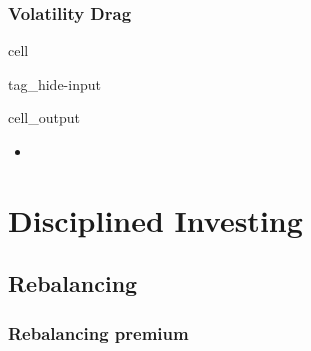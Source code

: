 \documentclass[letterpaper,10pt,english]{jupyterBook}
\begin{document}
\subsubsection{Volatility Drag}
\label{\detokenize{ch/principles/intro_nb:volatility-drag}}\label{\detokenize{ch/principles/intro_nb:fin-edu-principles-time-volatility-drag}}
\begin{sphinxuseclass}{cell}
\begin{sphinxuseclass}{tag_hide-input}\begin{sphinxVerbatimOutput}

\begin{sphinxuseclass}{cell_output}
\noindent{}

\end{sphinxuseclass}\end{sphinxVerbatimOutput}

\end{sphinxuseclass}
\end{sphinxuseclass}
\sphinxAtStartPar
{}
\begin{itemize}
\item {} 
\sphinxAtStartPar
{}

\end{itemize}


\section{Disciplined Investing}
\label{\detokenize{ch/principles/intro_nb:disciplined-investing}}\label{\detokenize{ch/principles/intro_nb:fin-edu-principles-investing}}

\subsection{Rebalancing}
\label{\detokenize{ch/principles/intro_nb:rebalancing}}\label{\detokenize{ch/principles/intro_nb:fin-edu-principles-rebalancing}}
\sphinxAtStartPar
{}


\subsubsection{Rebalancing premium}
\label{\detokenize{ch/principles/intro_nb:rebalancing-premium}}\label{\detokenize{ch/principles/intro_nb:fin-edu-principles-rebalancing-premium}}
\end{document}
